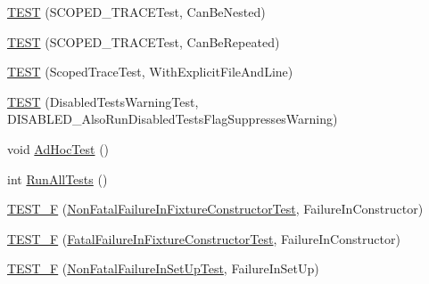 \begin{DoxyCompactItemize}
\item 
\mbox{\hyperlink{_obj__test_2lib_2googletest-release-1_88_81_2googletest_2test_2googletest-output-test___8cc_ae402e91f305e54f5f14a172a0fb0831b}{T\+E\+ST}} (S\+C\+O\+P\+E\+D\+\_\+\+T\+R\+A\+C\+E\+Test, Can\+Be\+Nested)
\item 
\mbox{\hyperlink{_obj__test_2lib_2googletest-release-1_88_81_2googletest_2test_2googletest-output-test___8cc_a49c4610eeb41adaa369f9dce003d5198}{T\+E\+ST}} (S\+C\+O\+P\+E\+D\+\_\+\+T\+R\+A\+C\+E\+Test, Can\+Be\+Repeated)
\item 
\mbox{\hyperlink{_obj__test_2lib_2googletest-release-1_88_81_2googletest_2test_2googletest-output-test___8cc_aff587c2c7d3e81f4d94425987ca07bc1}{T\+E\+ST}} (Scoped\+Trace\+Test, With\+Explicit\+File\+And\+Line)
\item 
\mbox{\hyperlink{_obj__test_2lib_2googletest-release-1_88_81_2googletest_2test_2googletest-output-test___8cc_a2bdac0e0076d65fa77a967c0fdb46e2a}{T\+E\+ST}} (Disabled\+Tests\+Warning\+Test, D\+I\+S\+A\+B\+L\+E\+D\+\_\+\+Also\+Run\+Disabled\+Tests\+Flag\+Suppresses\+Warning)
\item 
void \mbox{\hyperlink{_obj__test_2lib_2googletest-release-1_88_81_2googletest_2test_2googletest-output-test___8cc_a36cd4d21174efaa3066237d716028d49}{Ad\+Hoc\+Test}} ()
\item 
int \mbox{\hyperlink{_obj__test_2lib_2googletest-release-1_88_81_2googletest_2test_2googletest-output-test___8cc_ae0ca194f6b730e168850ce3179ad4f63}{Run\+All\+Tests}} ()
\item 
\mbox{\hyperlink{_obj__test_2lib_2googletest-release-1_88_81_2googletest_2test_2googletest-output-test___8cc_ad122def39d78da61690433e185611737}{T\+E\+S\+T\+\_\+F}} (\mbox{\hyperlink{class_non_fatal_failure_in_fixture_constructor_test}{Non\+Fatal\+Failure\+In\+Fixture\+Constructor\+Test}}, Failure\+In\+Constructor)
\item 
\mbox{\hyperlink{_obj__test_2lib_2googletest-release-1_88_81_2googletest_2test_2googletest-output-test___8cc_a858b341fa0b2298c1534b1325fedf797}{T\+E\+S\+T\+\_\+F}} (\mbox{\hyperlink{class_fatal_failure_in_fixture_constructor_test}{Fatal\+Failure\+In\+Fixture\+Constructor\+Test}}, Failure\+In\+Constructor)
\item 
\mbox{\hyperlink{_obj__test_2lib_2googletest-release-1_88_81_2googletest_2test_2googletest-output-test___8cc_aaa9d6fcc5d9910aedb42ff3db3cc313c}{T\+E\+S\+T\+\_\+F}} (\mbox{\hyperlink{class_non_fatal_failure_in_set_up_test}{Non\+Fatal\+Failure\+In\+Set\+Up\+Test}}, Failure\+In\+Set\+Up)
\item 

\end{DoxyCompactItemize}
